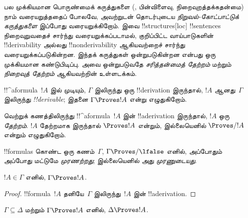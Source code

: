 \documentclass[../../../include/open-logic-section]{subfiles}
\begin{document}
      {}
      {}


\begin{explain}
பல முக்கியமான பொருண்மைக் கருத்துகளை
(, பின்விளைவு,
நிறைவுறத்தக்கதன்மை) நாம் வரையறுத்ததைப் போலவே, அவற்றுடன் தொடர்புடைய
\emph{நிறுவல்-கோட்பாட்டுக் கருத்துகளை} இப்போது வரையறுக்கிறோம். இவை
!!{structure}s[loc] !!{sentence}s நிறைவுறுவதைச் சார்ந்து வரையறுக்கப்படாமல்,
குறிப்பிட்ட வாய்பாடுகளின் !!{derivability} அல்லது !!{nonderivability}
ஆகியவற்றைச் சார்ந்து வரையறுக்கப்படுகின்றன. இந்தக் கருத்துகள் ஒன்றுபடுகின்றன
என்பது ஒரு முக்கியமான கண்டுபிடிப்பு. அவை ஒன்றுபடுவதே \emph{சரித்தன்மைத்
தேற்றம்} மற்றும் \emph{நிறைவுத் தேற்றம்} ஆகியவற்றின் உள்ளடக்கம்.
\end{explain}

\begin{defn}[!!^{derivability}]
!!^a{formula}~$!A$ இல் முடியும், $\Gamma$ இலிருந்து ஒரு
!!{derivation} இருந்தால், $!A$ ஆனது~$\Gamma$ இலிருந்து
\emph{!!{derivable}}; இதனை $\Gamma \Proves !A$ என்று எழுதுகிறோம்.
\end{defn}

\begin{defn}[தேற்றங்கள்]
வெற்றுக் கணத்திலிருந்து !!^a{formula}~$!A$ இன் !!a{derivation} இருந்தால்,
$!A$ ஒரு \emph{தேற்றம்}. $!A$ தேற்றமாக இருந்தால் $\Proves !A$ என்றும்,
இல்லையெனில் $\Proves/ !A$ என்றும் எழுதுகிறோம்.
\end{defn}

\begin{defn}[முரணின்மை]
!!{formula}s கொண்ட ஒரு கணம்~$\Gamma$, $\Gamma\Proves/ \lfalse$ எனில்,
அப்போதும் அப்போது மட்டுமே \emph{முரணற்றது}; இல்லையெனில் அது
\emph{முரணுடையது}.
\end{defn}

\begin{prop}[தற்சுட்டுப் பண்பு]
$!A \in \Gamma$ எனில், $\Gamma \Proves !A$.
\end{prop}

\begin{proof}
  !!{formula}~$!A$ தனியே~$\Gamma$ இலிருந்து~$!A$ இன்
  !!a{derivation}.
\end{proof}

\begin{prop}[ஒருபோக்குத்தன்மை]
$\Gamma \subseteq \Delta$ மற்றும் $\Gamma \Proves !A$ எனில், $\Delta
\Proves !A$.
\end{prop}
\end{document}

